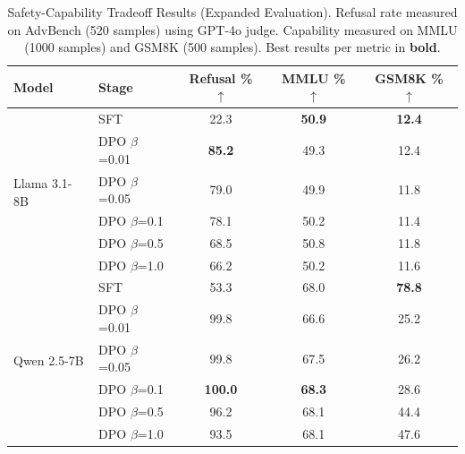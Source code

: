 
\begin{table}[t]
\centering
\caption{Safety-Capability Tradeoff Results (Expanded Evaluation). Refusal rate measured on AdvBench (520 samples) using GPT-4o judge. Capability measured on MMLU (1000 samples) and GSM8K (500 samples). Best results per metric in \textbf{bold}.}
\label{tab:main_results_expanded}
\begin{tabular}{llccc}
\toprule
\textbf{Model} & \textbf{Stage} & \textbf{Refusal \%} $\uparrow$ & \textbf{MMLU \%} $\uparrow$ & \textbf{GSM8K \%} $\uparrow$ \\
\midrule
\multirow{6}{*}{Llama 3.1-8B}
 & SFT & 22.3 & \textbf{50.9} & \textbf{12.4} \\
 & DPO $\beta$=0.01 & \textbf{85.2} & 49.3 & 12.4 \\
 & DPO $\beta$=0.05 & 79.0 & 49.9 & 11.8 \\
 & DPO $\beta$=0.1 & 78.1 & 50.2 & 11.4 \\
 & DPO $\beta$=0.5 & 68.5 & 50.8 & 11.8 \\
 & DPO $\beta$=1.0 & 66.2 & 50.2 & 11.6 \\
\midrule
\multirow{6}{*}{Qwen 2.5-7B}
 & SFT & 53.3 & 68.0 & \textbf{78.8} \\
 & DPO $\beta$=0.01 & 99.8 & 66.6 & 25.2 \\
 & DPO $\beta$=0.05 & 99.8 & 67.5 & 26.2 \\
 & DPO $\beta$=0.1 & \textbf{100.0} & \textbf{68.3} & 28.6 \\
 & DPO $\beta$=0.5 & 96.2 & 68.1 & 44.4 \\
 & DPO $\beta$=1.0 & 93.5 & 68.1 & 47.6 \\
\bottomrule
\end{tabular}
\end{table}
